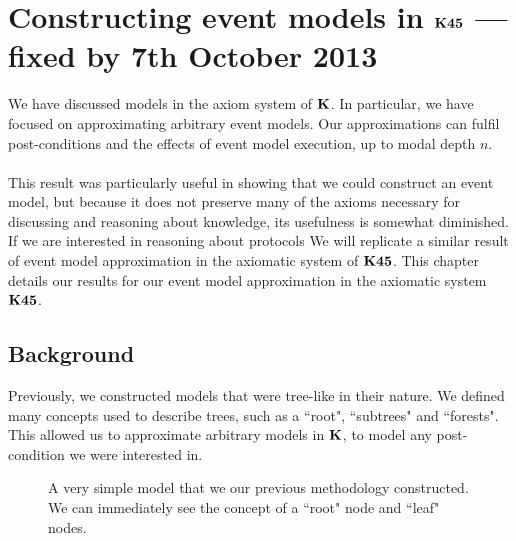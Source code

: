 \section{Constructing event models in $\bf K45$ --- fixed by 7th October 2013} \label{chapter:k45}

We have discussed models in the axiom system of $\bf K$.
In particular, we have focused on approximating arbitrary event models.
Our approximations can fulfil post-conditions and the effects of event model execution, up to modal
depth $n$.\\
\\
This result was particularly useful in showing that we could construct an event model, but because
it does not preserve many of the axioms necessary for discussing and reasoning about knowledge, its
usefulness is somewhat diminished.
If we are interested in reasoning about protocols
We will replicate a similar result of event model approximation in the axiomatic system
of $\bf K45$.
This chapter details our results for our event model approximation in the axiomatic system
$\bf K45$.

\subsection{Background}

Previously, we constructed models that were tree-like in their nature.
We defined many concepts used to describe trees, such as a ``root", ``subtrees" and ``forests".
This allowed us to approximate arbitrary models in $\bf K$, to model any post-condition we
were interested in.

\begin{figure}[ht!]
\centering
{}
\caption{A very simple model that we our previous methodology constructed.
We can immediately see the concept of a ``root" node and ``leaf" nodes.}
\label{exampleModel}
\end{figure}

